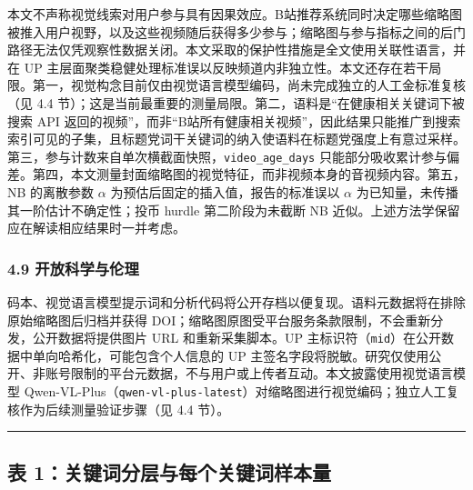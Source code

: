 \documentclass[
  fontset=none]{ctexart}
\begin{document}
本文不声称视觉线索对用户参与具有因果效应。B站推荐系统同时决定哪些缩略图被推入用户视野，以及这些视频随后获得多少参与；缩略图与参与指标之间的后门路径无法仅凭观察性数据关闭。本文采取的保护性措施是全文使用关联性语言，并在 UP 主层面聚类稳健处理标准误以反映频道内非独立性。本文还存在若干局限。第一，视觉构念目前仅由视觉语言模型编码，尚未完成独立的人工金标准复核（见 4.4 节）；这是当前最重要的测量局限。第二，语料是``在健康相关关键词下被搜索 API 返回的视频''，而非``B站所有健康相关视频''，因此结果只能推广到搜索索引可见的子集，且标题党词干关键词的纳入使语料在标题党强度上有意过采样。第三，参与计数来自单次横截面快照，\texttt{video\_age\_days} 只能部分吸收累计参与偏差。第四，本文测量封面缩略图的视觉特征，而非视频本身的音视频内容。第五，NB 的离散参数 \(\alpha\) 为预估后固定的插入值，报告的标准误以 \(\alpha\) 为已知量，未传播其一阶估计不确定性；投币 hurdle 第二阶段为未截断 NB 近似。上述方法学保留应在解读相应结果时一并考虑。

\subsubsection{4.9 开放科学与伦理}\label{ux9884ux6ce8ux518cux5f00ux653eux79d1ux5b66ux4e0eux4f26ux7406}

码本、视觉语言模型提示词和分析代码将公开存档以便复现。语料元数据将在排除原始缩略图后归档并获得 DOI；缩略图原图受平台服务条款限制，不会重新分发，公开数据将提供图片 URL 和重新采集脚本。UP 主标识符（\texttt{mid}）在公开数据中单向哈希化，可能包含个人信息的 UP 主签名字段将脱敏。研究仅使用公开、非账号限制的平台元数据，不与用户或上传者互动。本文披露使用视觉语言模型 Qwen-VL-Plus（\texttt{qwen-vl-plus-latest}）对缩略图进行视觉编码；独立人工复核作为后续测量验证步骤（见 4.4 节）。

\begin{center}\rule{0.5\linewidth}{0.5pt}\end{center}

\subsection{表 1：关键词分层与每个关键词样本量}\label{ux8868-1ux5173ux952eux8bcdux5206ux5c42ux4e0eux6bcfux4e2aux5173ux952eux8bcdux6837ux672cux91cf}
\end{document}
